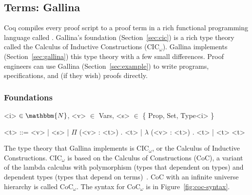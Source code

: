 \subsection{Terms: Gallina}
\label{sec:mot-coq}


Coq compiles every proof script to a proof term in a rich functional programming language called .
Gallina's foundation (Section~\ref{sec:cic}) is a rich type theory called the Calculus of Inductive Constructions (CIC$_{\omega}$).
Gallina implements (Section~\ref{sec:gallina}) this type theory with a few small differences.
Proof engineers can use Gallina (Section~\ref{sec:example}) to write programs, specifications, and (if they wish) proofs directly.


\subsubsection{Foundations}

\begin{figure*}
\small
\begin{grammar}
<i> $\in \mathbbm{N}$, <v> $\in$ Vars, <s> $\in$ \{ Prop, Set, Type<i> \}

<t> ::= <v> \hspace{0.06cm} | \hspace{0.06cm} <s> \hspace{0.06cm} | \hspace{0.06cm} $\Pi$ (<v> : <t>) . <t> \hspace{0.06cm} | \hspace{0.06cm} $\lambda$ (<v> : <t>) . <t> \hspace{0.06cm} | \hspace{0.06cm} <t> <t>
\end{grammar}
\vspace{-0.3cm}
\caption{Syntax for CoC$_\omega$ with (from left to right) variables, sorts, dependent types, functions, and application.}
\label{fig:coc-syntax}
\end{figure*}

The type theory that Gallina implements is CIC$_{\omega}$, or the Calculus of Inductive Constructions.
CIC$_{\omega}$ is based on the Calculus of Constructions (CoC), a variant of the lambda calculus with polymorphism (types that dependent on types) and dependent types (types that depend on terms)~\cite{coquand:inria-00076024}.
CoC with an infinite universe hierarchy is called CoC$_{\omega}$. %
The syntax for CoC$_{\omega}$ is in Figure~\ref{fig:coc-syntax}.

